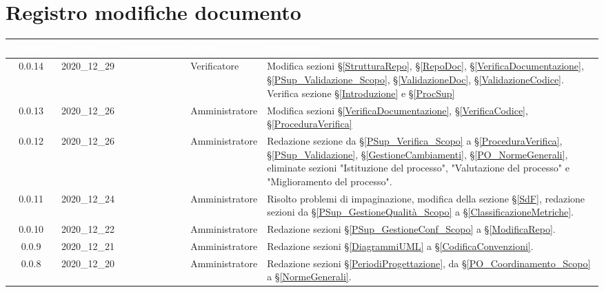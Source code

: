 \section*{Registro modifiche documento}
{
\renewcommand{\arraystretch}{1.5}
\centering
\begin{longtable}{ c c  C{2.3cm} C{3cm} C{3.2cm}}


 \textcolor{white}{\textbf{Versione}}&
    \textcolor{white}{\textbf{Data}}&
    \textcolor{white}{\textbf{Nominativo}}&
    \textcolor{white}{\textbf{Ruolo}}&
    \textcolor{white}{\textbf{Descrizione}}\\	
    \endhead
    
    0.0.14 & 2020\_12\_29 & \BL{} & Verificatore & Modifica sezioni \S\ref{StrutturaRepo}, \S\ref{RepoDoc}, \S\ref{VerificaDocumentazione}, \S\ref{PSup_Validazione_Scopo}, \S\ref{ValidazioneDoc}, \S\ref{ValidazioneCodice}. Verifica sezione \S\ref{Introduzione} e \S\ref{ProcSup} \\
    
    0.0.13 & 2020\_12\_26 & \TG{}  & Amministratore & Modifica sezioni \S\ref{VerificaDocumentazione}, \S\ref{VerificaCodice}, \S\ref{ProceduraVerifica} \\
    
      0.0.12 & 2020\_12\_26 & \TG{}  & Amministratore & Redazione sezione da \S\ref{PSup_Verifica_Scopo} a \S\ref{ProceduraVerifica}, \S\ref{PSup_Validazione}, \S\ref{GestioneCambiamenti}, \S\ref{PO_NormeGenerali}, eliminate sezioni "Istituzione del processo", "Valutazione del processo" e "Miglioramento del processo". \\
    
     0.0.11 & 2020\_12\_24 & \TG{}  & Amministratore & Risolto problemi di impaginazione, modifica della sezione \S\ref{SdF}, redazione sezioni da \S\ref{PSup_GestioneQualità_Scopo} a \S\ref{ClassificazioneMetriche}. \\
    
     0.0.10 & 2020\_12\_22 & \TG{}  & Amministratore & Redazione sezioni \S\ref{PSup_GestioneConf_Scopo} a \S\ref{ModificaRepo}. \\
    
    0.0.9 & 2020\_12\_21 & \TG{}  & Amministratore & Redazione sezioni \S\ref{DiagrammiUML} a \S\ref{CodificaConvenzioni}. \\
    
    0.0.8 & 2020\_12\_20 & \TG{}  & Amministratore & Redazione sezioni \S\ref{PeriodiProgettazione}, da \S\ref{PO_Coordinamento_Scopo} a \S\ref{NormeGenerali}. \\
    

\end{longtable}}
